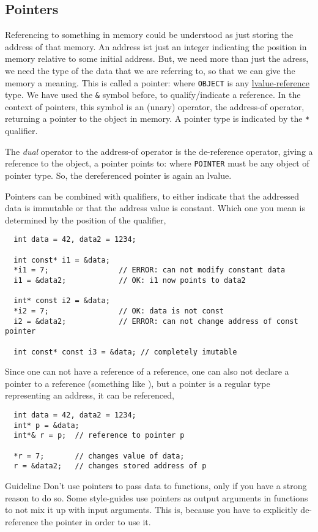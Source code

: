 \subsection{Pointers}
Referencing to something in memory could be understood as just storing the address of that memory. An address ist just an integer indicating
the position in memory relative to some initial address. But, we need more than just the adress, we need the type of the data that we are
referring to, so that we can give the memory a meaning. This is called a pointer:
%
%
where \texttt{OBJECT} is any \underline{lvalue-reference} type.
We have used the \texttt{\&} symbol before, to qualify/indicate a reference. In the context of pointers, this symbol is an (unary) operator, the
address-of operator, returning a pointer to the object in memory. A pointer type is indicated by the \texttt{*} qualifier.

The \textit{dual} operator to the address-of operator is the de-reference operator, giving a reference to the object, a pointer points to:
%
%
where \texttt{POINTER} must be any object of pointer type. So, the dereferenced pointer is again an lvalue.

Pointers can be combined with  qualifiers, to either indicate that the addressed data is immutable or that the address value is constant.
Which one you mean is determined by the position of the  qualifier, \ie
%
\begin{verbatim}
  int data = 42, data2 = 1234;

  int const* i1 = &data;
  *i1 = 7;                // ERROR: can not modify constant data
  i1 = &data2;            // OK: i1 now points to data2

  int* const i2 = &data;
  *i2 = 7;                // OK: data is not const
  i2 = &data2;            // ERROR: can not change address of const pointer

  int const* const i3 = &data; // completely imutable
\end{verbatim}

Since one can not have a reference of a reference, one can also not declare a pointer to a reference (something like ), but a
pointer is a regular type representing an address, it can be referenced, \ie
%
\begin{verbatim}
  int data = 42, data2 = 1234;
  int* p = &data;
  int*& r = p;  // reference to pointer p

  *r = 7;       // changes value of data;
  r = &data2;   // changes stored address of p
\end{verbatim}

\begin{guideline}{Guideline}
  Don't use pointers to pass data to functions, only if you have a strong reason to do so. Some style-guides use pointers as output arguments
  in functions to not mix it up with input arguments. This is, because you have to explicitly de-reference the pointer in order to use it.
\end{guideline}
